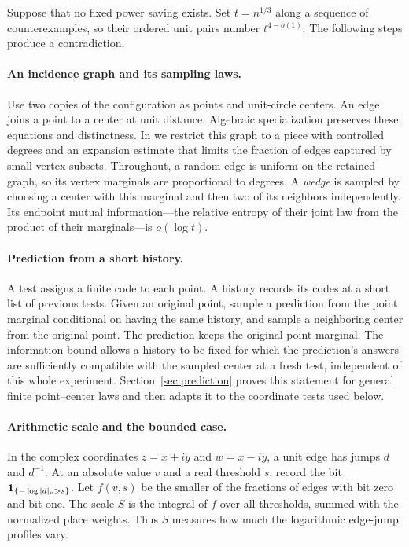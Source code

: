 Suppose that no fixed power saving exists. Set \(t=n^{1/3}\) along a sequence
of counterexamples, so their ordered unit pairs number \(t^{4-o(1)}\).
The following steps produce a contradiction.

\paragraph{An incidence graph and its sampling laws.}
Use two copies of the configuration as points and unit-circle centers.
An edge joins a point to a center at unit distance. Algebraic
specialization preserves these equations and distinctness. In
 we restrict this graph to a piece with controlled
degrees and an expansion estimate that limits the fraction of edges
captured by small vertex subsets. Throughout, a random edge is uniform
on the retained graph, so its vertex marginals are proportional to
degrees. A \emph{wedge} is sampled by choosing a center with this
marginal and then two of its neighbors independently. Its endpoint
mutual information---the relative entropy of their joint law from the
product of their marginals---is \(o(\log t)\).

\paragraph{Prediction from a short history.}
A test assigns a finite code to each point. A history records its codes
at a short list of previous tests. Given an original point, sample a
prediction from the point marginal conditional on having the same
history, and sample a neighboring center from the original point.
The prediction keeps the original point marginal. The information
bound allows a history to be fixed for which the prediction's answers
are sufficiently compatible with the sampled center at a fresh test,
independent of this whole experiment. Section~\ref{sec:prediction}
proves this statement for general finite point--center laws and then
adapts it to the coordinate tests used below.

\paragraph{Arithmetic scale and the bounded case.}
In the complex coordinates \(z=x+iy\) and \(w=x-iy\), a unit edge
has jumps \(d\) and \(d^{-1}\). At an absolute value \(v\) and a real
threshold \(s\), record the bit \(\mathbf 1_{\{-\log|d|_v>s\}}\).
Let \(f(v,s)\) be the smaller of the fractions of edges with bit zero
and bit one. The scale \(S\) is the integral of \(f\) over all
thresholds, summed with the normalized place weights. Thus \(S\)
measures how much the logarithmic edge-jump profiles vary.

